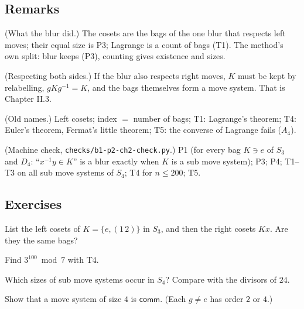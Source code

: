 \subsection*{Remarks}

\begin{lines}
\item[\lab{R1}] (What the blur did.) The cosets are the bags of the one blur that respects left moves; their equal size is P3; Lagrange is a count of bags (T1). The method's own split: blur keeps (P3), counting gives existence and sizes.
\item[\lab{R2}] (Respecting both sides.) If the blur also respects right moves, $K$ must be kept by relabelling, $gKg^{-1} = K$, and the bags themselves form a move system. That is Chapter II.3.
\item[\lab{R3}] (Old names.) Left cosets; index $= $ number of bags; T1: Lagrange's theorem; T4: Euler's theorem, Fermat's little theorem; T5: the converse of Lagrange fails ($A_4$).
\item[\lab{R4}] (Machine check, \texttt{checks/b1-p2-ch2-check.py}.) P1 (for every bag $K \ni e$ of $S_3$ and $D_4$: ``$x^{-1}y \in K$'' is a blur exactly when $K$ is a sub move system); P3; P4; T1--T3 on all sub move systems of $S_4$; T4 for $n \le 200$; T5.
\end{lines}

\subsection*{Exercises}

\begin{lines}
\item[\lab{E1}] List the left cosets of $K = \{e, (1\,2)\}$ in $S_3$, and then the right cosets $Kx$. Are they the same bags?
\item[\lab{E2}] Find $3^{100} \bmod 7$ with T4.
\item[\lab{E3}] Which sizes of sub move systems occur in $S_4$? Compare with the divisors of $24$.
\item[\lab{E4}] Show that a move system of size $4$ is $\mathsf{comm}$. (Each $g \ne e$ has order $2$ or $4$.)
\end{lines}

\newpage

